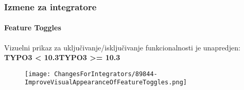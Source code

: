 
\begin{frame}[fragile]
	\frametitle{Izmene za integratore}
	\framesubtitle{Feature Toggles}

	Vizuelni prikaz za uključivanje/isključivanje funkcionalnosti je unapredjen:
	\newline\newline
	\smaller\textbf{TYPO3 < 10.3}\tabto{6cm}\textbf{TYPO3 >= 10.3}\normalsize

	\begin{figure}
		\texttt{[image: ChangesForIntegrators/89844-ImproveVisualAppearanceOfFeatureToggles.png]}
	\end{figure}

\end{frame}

%
%
%
%
%
%
%
